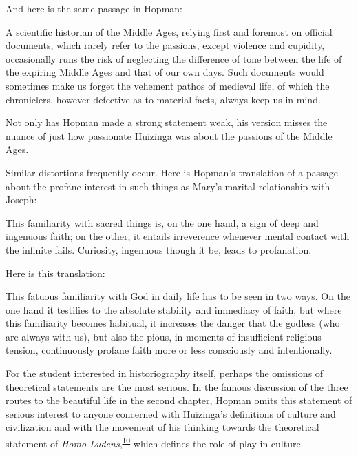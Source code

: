 And here is the same passage in Hopman:

A scientific historian of the Middle Ages, relying first and foremost on
official documents, which rarely refer to the
\protect\hypertarget{05_TRANSLATOR_S_INTRODUCTION.xhtmlux5cux23page_xv}{}{}passions,
except violence and cupidity, occasionally runs the risk of neglecting
the difference of tone between the life of the expiring Middle Ages and
that of our own days. Such documents would sometimes make us forget the
vehement pathos of medieval life, of which the chroniclers, however
defective as to material facts, always keep us in mind.

Not only has Hopman made a strong statement weak, his version misses the
nuance of just how passionate Huizinga was about the passions of the
Middle Ages.

Similar distortions frequently occur. Here is Hopman's translation of a
passage about the profane interest in such things as Mary's marital
relationship with Joseph:

This familiarity with sacred things is, on the one hand, a sign of deep
and ingenuous faith; on the other, it entails irreverence whenever
mental contact with the infinite fails. Curiosity, ingenuous though it
be, leads to profanation.

Here is this translation:

This fatuous familiarity with God in daily life has to be seen in two
ways. On the one hand it testifies to the absolute stability and
immediacy of faith, but where this familiarity becomes habitual, it
increases the danger that the godless (who are always with us), but also
the pious, in moments of insufficient religious tension, continuously
profane faith more or less consciously and intentionally.

For the student interested in historiography itself, perhaps the
omissions of theoretical statements are the most serious. In the famous
discussion of the three routes to the beautiful life in the second
chapter, Hopman omits this statement of serious interest to anyone
concerned with Huizinga's definitions of culture and civilization and
with the movement of his thinking towards the theoretical statement of
\emph{Homo
Ludens},\textsuperscript{\protect\hypertarget{05_TRANSLATOR_S_INTRODUCTION.xhtmlux5cux23id_2229}{\protect\hyperlink{23_NOTES.xhtmlux5cux23id_2230}{10}}}
which defines the role of play in culture.

